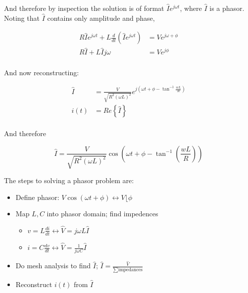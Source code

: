 \documentclass[10pt]{article}
\begin{document}
And therefore by inspection the solution is of format $ \hat{I} e^{j\omega t} $, where $ \hat{I} $ is a phasor. Noting that $ \hat{I} $  contains only amplitude and phase,

\begin{equation}
	\begin{split}
	R \hat{I} e ^{j \omega t} + L \frac{d}{dt}(\hat{I} e^{j \omega t}) &= Ve^{j \omega + \phi} \\
		R \hat{I} + L \hat{I} j \omega  &= Ve^{j \phi} \\
\end{split}
\end{equation}

And now reconstructing:

\begin{equation}
	\begin{split}
		\hat{I} &= \frac{V}{\sqrt{R^2 (\omega L)^2}} e^{j(\omega t + \phi - \tan^{-1}{\frac{wL}{R}})} \\
		 i(t) &= Re \left\{ \hat{I} \right\}   \\
	\end{split}
\end{equation}

And therefore

\begin{equation}
	\hat{I} = \frac{V}{\sqrt{R^2 (\omega L)^2}} \cos{(\omega t + \phi - \tan^{-1}(\frac{wL}{R}))}
\end{equation}


The steps to solving a phasor problem are:
\begin{itemize}
	\item Define phasor: $ V \cos{(\omega t + \phi)} \leftrightarrow V\lfloor\phi $ 
	\item Map $ L, C $ into phasor domain; find impedences
		\begin{itemize}
			\item $ v = L \frac{di}{dt} \leftrightarrow \hat{V} = j \omega L \hat{I} $ 
			\item $ i = C \frac{dv}{dt} \leftrightarrow \hat{V} = \frac{1}{j \omega C }\hat{I} $ 
		\end{itemize}
	\item Do mesh analysis to find $ \hat{I} $; $ \hat{I} = \frac{\hat{V}}{\sum \text{impedances} } $ 
	\item Reconstruct $ i(t) $ from $ \hat{I} $ 
\end{itemize}
\end{document}
